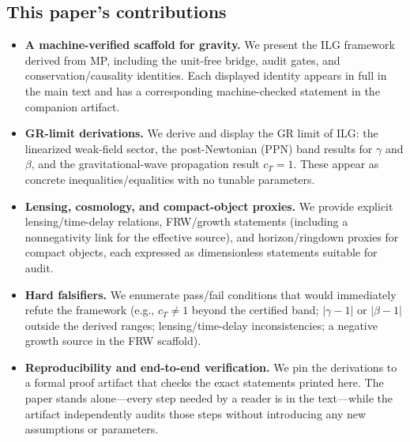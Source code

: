 \documentclass[12pt,a4paper]{article}
\begin{document}
\subsection{This paper’s contributions}
\begin{itemize}
  \item \textbf{A machine-verified scaffold for gravity.} We present the ILG framework derived from MP, including the unit-free bridge, audit gates, and conservation/causality identities. Each displayed identity appears in full in the main text and has a corresponding machine-checked statement in the companion artifact.
  \item \textbf{GR-limit derivations.} We derive and display the GR limit of ILG: the linearized weak-field sector, the post-Newtonian (PPN) band results for $\gamma$ and $\beta$, and the gravitational-wave propagation result $c_T=1$. These appear as concrete inequalities/equalities with no tunable parameters.
  \item \textbf{Lensing, cosmology, and compact-object proxies.} We provide explicit lensing/time-delay relations, FRW/growth statements (including a nonnegativity link for the effective source), and horizon/ringdown proxies for compact objects, each expressed as dimensionless statements suitable for audit.
  \item \textbf{Hard falsifiers.} We enumerate pass/fail conditions that would immediately refute the framework (e.g., $c_T\neq 1$ beyond the certified band; $|\gamma-1|$ or $|\beta-1|$ outside the derived ranges; lensing/time-delay inconsistencies; a negative growth source in the FRW scaffold).
  \item \textbf{Reproducibility and end-to-end verification.} We pin the derivations to a formal proof artifact that checks the exact statements printed here. The paper stands alone—every step needed by a reader is in the text—while the artifact independently audits those steps without introducing any new assumptions or parameters.
\end{itemize}
\end{document}

